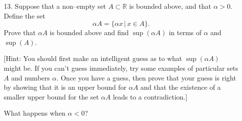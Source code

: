 \documentclass[12pt,a4paper]{article}
\newcommand{\R}{\mathbb{R}}
\begin{document}
\begin{enumerate}
\item[13.] Suppose that a non--empty set $A \subset \R$ is bounded above, and that $\alpha > 0$. Define the set
$$ \alpha A = \{\alpha x\,|\, x \in A\}.$$
Prove that $\alpha A$ is bounded above and find $\sup(\alpha A)$ in terms of $\alpha$ and $\sup(A)$. 

[Hint: You should first make an intelligent guess as to what $\sup(\alpha A)$ might be. If you can't guess immediately, try some examples of particular sets $A$ and numbers $\alpha$.
Once you have a guess, 
then prove that your guess is right by showing that it is an upper bound for $\alpha A$ and
that the existence of a smaller
 upper bound for the set $\alpha A$ leads to a contradiction.]


What happens when $\alpha < 0$?


\end{enumerate}
\end{document}
